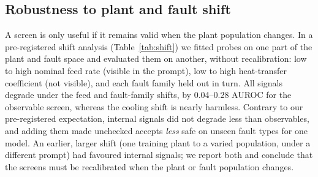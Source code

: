 

\subsection{Robustness to plant and fault shift}
A screen is only useful if it remains valid when the plant population changes. In a pre-registered shift analysis
(Table~\ref{tab:shift}) we fitted probes on one part of the plant and fault space and evaluated them on another,
without recalibration: low to high nominal feed rate (visible in the prompt), low to high heat-transfer coefficient
(not visible), and each fault family held out in turn. All signals degrade under the feed and fault-family shifts, by
0.04--0.28 AUROC for the observable screen, whereas the cooling shift is nearly harmless. Contrary to our
pre-registered expectation, internal signals did not degrade less than observables, and adding them made unchecked
accepts \emph{less} safe on unseen fault types for one model. An earlier, larger shift (one training plant to a varied
population, under a different prompt) had favoured internal signals; we report both and conclude that the screens
must be recalibrated when the plant or fault population changes.


